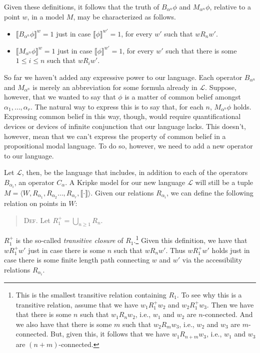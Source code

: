 Given these definitions, it follows that the truth of $B_{\alpha^n} \phi$ and $M_{\alpha^n} \phi$, relative to a point $w$, in a model $M$, may be characterized as follows.
\begin{itemize}
\item[] $\llbracket B_{\alpha^n} \phi \rrbracket^w = 1$ just in case $\llbracket \phi \rrbracket^{w'} = 1$, for every $w'$ such that  $w R_n w'$.
\item[] $\llbracket M_{\alpha^n} \phi \rrbracket^w = 1$ just in case $\llbracket \phi \rrbracket^{w'} = 1$, for every $w'$  such that there is some $1 \leq i \leq n$ such that $w R_i w'$.
\end{itemize}


So far we haven't added any expressive power to our language. 
Each operator $B_{\alpha^n}$ and $M_{\alpha^n}$ is merely an abbreviation for some formula already in $\mathcal{L}$.
Suppose, however, that we wanted to say that $\phi$ is a matter of common belief amongst $\alpha_1,\ldots,\alpha_r$.
The natural way to express this is to say that, for each $n$, $M_{\alpha^n} \phi$ holds.
Expressing common belief in this way, though, would require quantificational devices or devices of infinite conjunction that our language lacks.
This doesn't, however, mean that we can't express the property of common belief in a propositional modal language.
To do so, however, we need to add a new operator to our language.


Let $\mathcal{L}$, then, be the language that includes, in addition to each of the operators $B_{\alpha_i}$, an operator $C_\alpha$.
A Kripke model for our new language $\mathcal{L}$ will still be a tuple $M = \langle W, R_{\alpha_1}, R_{\alpha_2}\ldots,R_{\alpha_r},  \llbracket \cdot \rrbracket \rangle$.
Given our relations $R_{\alpha_i}$, we can define the following relation on points in $W$:

\begin{quote}
\textsc{Def.}\; Let $R^+_{1} = \bigcup_{n \geq 1} R_{n}$. 
%
%
\end{quote}

\noindent
$R^+_{1}$ is the so-called \textit{transitive closure} of $R_{1}$.\footnote{This is the smallest transitive relation containing $R_{1}$. To see why this is a transitive relation, assume that we have $w_1 R^+_{1} w_2$ and $w_2 R^+_{1} w_3$.
Then we have that there is some $n$ such that $w_1 R_{n} w_2$, i.e., $w_1$ and $w_2$ are $n$-connected.
And we also have that there is some $m$ such that $w_2 R_{m} w_3$, i.e., $w_2$ and $w_3$ are $m$-connected.
But, given this, it follows that we have $w_1 R_{n + m} w_3$, i.e., $w_1$ and $w_3$ are $(n + m)$-connected.}
Given this definition, we have that $w R^+_{1} w'$ just in case there is some $n$ such that $w R_{n} w'$.
Thus $w R^+_{1} w'$ holds just in case there is some finite length path connecting $w$ and $w'$ via the accessibility relations $R_{\alpha_i}$.

